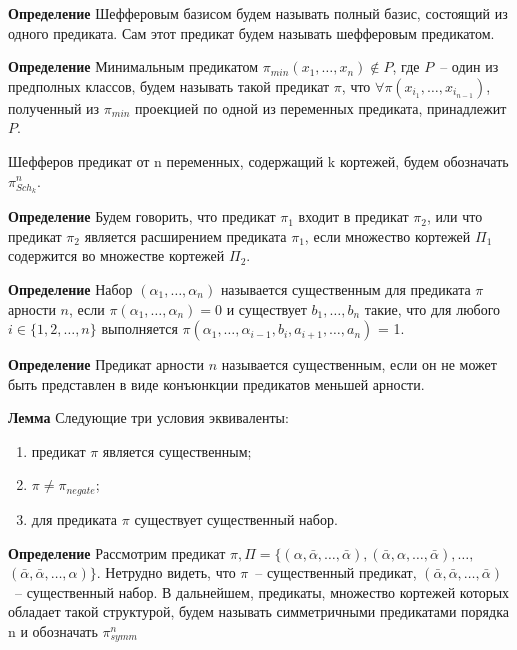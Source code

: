 \documentclass[12pt]{article}
\begin{document}
\textbf{Определение} Шефферовым базисом будем называть полный базис, состоящий из одного предиката. Сам этот предикат
будем называть шефферовым предикатом.

\textbf{Определение} Минимальным предикатом $\pi_{min}(x_1, \dots, x_n) \notin P$, где $P$~-- один из предполных классов, будем называть такой 
предикат $\pi$, что $\forall \pi(x_{i_1}, \dots, x_{i_{n-1}})$, полученный из $\pi_{min}$ проекцией по одной из переменных
предиката, принадлежит $P$.


Шефферов предикат от n переменных, содержащий k кортежей, будем обозначать $\pi_{Sch_k}^n$.

\textbf{Определение} Будем говорить, что предикат $\pi_1$ входит в предикат $\pi_2$, или что предикат $\pi_2$ является
расширением предиката $\pi_1$, если множество кортежей $\Pi_1$ содержится во множестве кортежей $\Pi_2$.

\textbf{Определение} Набор $(\alpha_1, \dots, \alpha_n)$ называется существенным для предиката $\pi$ арности $n$, если
$\pi(\alpha_1, \dots, \alpha_n) = 0$ и существует $b_1, \dots, b_n$ такие, что для любого $i \in \{ 1, 2, \dots, n\}$
выполняется 
$\pi(\alpha_1, \dots, \alpha_{i-1}, b_i, a_{i+1}, \dots, a_n)$ = 1.

\textbf{Определение} Предикат арности $n$ называется существенным, если он не может быть представлен в виде конъюнкции
предикатов меньшей арности.

\textbf{Лемма} Следующие три условия эквиваленты: 
\begin{enumerate}
\item предикат $\pi$ является существенным;
\item $\pi \neq \pi_{negate}$;
\item для предиката $\pi$ существует существенный набор. 
\end{enumerate}\cite{Zhuk}

\textbf{Определение}
Рассмотрим предикат 
$\pi, \Pi = \{ (\alpha, \bar{\alpha}, \dots, \bar{\alpha}), (\bar{\alpha}, \alpha, \dots, \bar{\alpha}), \dots, $
$(\bar{\alpha}, \bar{\alpha}, \dots, \alpha) \}$. Нетрудно видеть, что $\pi$~-- существенный предикат, 
$(\bar{\alpha}, \bar{\alpha}, \dots, \bar{\alpha})$~-- существенный набор. 
В дальнейшем, предикаты, множество кортежей которых обладает такой структурой, будем называть 
симметричными предикатами порядка n и обозначать $\pi_{symm}^n$
\end{document}

